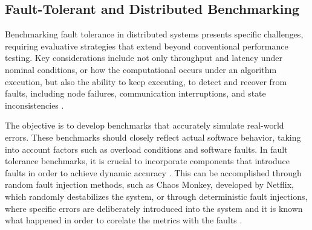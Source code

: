 \subsection{Fault-Tolerant and Distributed Benchmarking}

Benchmarking fault tolerance in distributed systems presents specific challenges, requiring evaluative strategies that extend beyond conventional performance testing. Key considerations include not only throughput and latency under nominal conditions, or how the computational occurs under an algorithm execution, but also the ability to keep executing, to detect and recover from faults, including node failures, communication interruptions, and state inconsistencies \cite{Randtoul2022, Blessing2019, Almeida2013}.

The objective is to develop benchmarks that accurately simulate real-world errors. These benchmarks should closely reflect actual software behavior, taking into account factors such as overload conditions and software faults. In fault tolerance benchmarks, it is crucial to incorporate components that introduce faults in order to achieve dynamic accuracy \cite{Almeida2013}. This can be accomplished through random fault injection methods, such as Chaos Monkey, developed by Netflix, which randomly destabilizes the system, or through deterministic fault injections, where specific errors are deliberately introduced into the system and it is known what happened in order to corelate the metrics with the faults \cite{Randtoul2022}.

